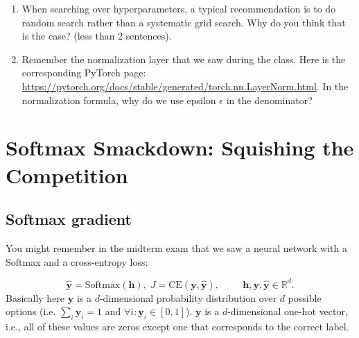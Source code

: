 \begin{enumerate}
    \item When searching over hyperparameters, a typical recommendation is to do random search rather than a systematic grid search. 
    Why do you think that is the case? (less than 2 sentences). 
    \item Remember the normalization layer that we saw during the class. Here is the corresponding PyTorch page: \url{https://pytorch.org/docs/stable/generated/torch.nn.LayerNorm.html}. 
    In the normalization formula, why do we use epsilon $\epsilon$ in the denominator? \\ 
    
\end{enumerate}

\section{Softmax Smackdown: Squishing the Competition}

\subsection{Softmax gradient}

You might remember in the midterm exam that we saw a neural network with a Softmax and a cross-entropy loss: 

$$ 
\hat{\textbf{y}} = \text{Softmax}(\textbf{h}),\; J = \text{CE}(\mathbf{y}, \hat{\mathbf{y}}), \hspace{1cm} \textbf{h}, \mathbf{y}, \hat{\mathbf{y}} \in \mathbb{R}^d.
$$
Basically here $\hat{\mathbf{y}}$ is a $d$-dimensional probability distribution over $d$ possible options (i.e. 
$\sum_i  \mathbf{y}_i = 1$ and $\forall i: \mathbf{y}_i \in [0, 1]$). 
$\mathbf{y}$ is a $d$-dimensional one-hot vector, i.e., all of these values are zeros except one that corresponds to the correct label. 

